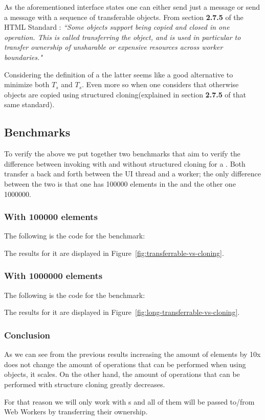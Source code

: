 As the aforementioned interface states one can either send just a message or send a message with a sequence of transferable objects. From section \textbf{2.7.5} of the HTML Standard \cite{html-whatwg}:
\textit{``Some objects support being copied and closed in one operation. This is called transferring the object, and is used in particular to transfer ownership of unsharable or expensive resources across worker boundaries."}

Considering the definition of a  the latter seems like a good alternative to minimize both \(T_{s}\) and \(T_{s}\). Even more so when one considers that otherwise objects are copied using structured cloning(explained in section \textbf{2.7.5} of that same standard).

\subsection{Benchmarks}
To verify the above we put together two benchmarks that aim to verify the difference between invoking  with and without structured cloning for a \ttarray{}. Both transfer a \ttarray{} back and forth between the UI thread and a worker; the only difference between the two is that one has 100000 elements in the \ttarray{} and the other one 1000000.

\subsubsection{With 100000 elements}
The following is the code for the benchmark:

The results for it are displayed in Figure~\ref{fig:transferrable-vs-cloning}.

\subsubsection{With 1000000 elements}
The following is the code for the benchmark:

The results for it are displayed in Figure~\ref{fig:long-transferrable-vs-cloning}.

\subsubsection{Conclusion}
As we can see from the previous results increasing the amount of elements by 10x does not change the amount of operations that can be performed when using  objects, it scales. On the other hand, the amount of operations that can be performed with structure cloning greatly decreases.

For that reason we will only work with {\ttarray{}}s and all of them will be passed to/from Web Workers by transferring their ownership.

\pagebreak